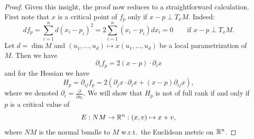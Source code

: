 \begin{figure}[H]
    \centering
    \label{fig:existence-of-morse-functions-normal-bundle-map}
\end{figure}

\begin{proof}
    Given this insight, the proof now reduces to a straightforward calculation.
    First note that $x$ is a critical point of $f_p$ only if $x-p \perp T_x M$.
    Indeed:
    \[
        d f_p = \sum_{i=1}^{n} d(x_i - p_i)^2 = 2 \sum_{i=1}^{n} (x_i-p_i) dx_i = 0 \qquad \text{if $x-p \perp T_x M$}
    .\] 
    Let $d = \dim M$ and $(u_1, \ldots, u_d) \mapsto x(u_1, \ldots, u_d)$ be a local parametrization of $M$.
    Then we have
    \[
        \partial_i f_p = 2(x-p) \cdot  \partial_i  x
    \] 
    and for the Hessian we have
    \[
    H_p = \partial_{ij} f_p = 2 \left(\partial_j x \cdot \partial_i x  + (x-p) \partial_{ij} x \right)
    ,\] 
    where we denoted $\partial_i = \frac{\partial }{\partial u_i}$.
    We will show that $H_p$ is not of full rank if and only if $p$ is a critical value of  
    \[
        E: NM \to  \mathbb{R}^n: (x, v) \mapsto x + v
    ,\] 
    where $NM$ is the normal bundle to $M$ w.r.t.\ the Euclidean metric on $\mathbb{R}^n$.


\end{proof}
